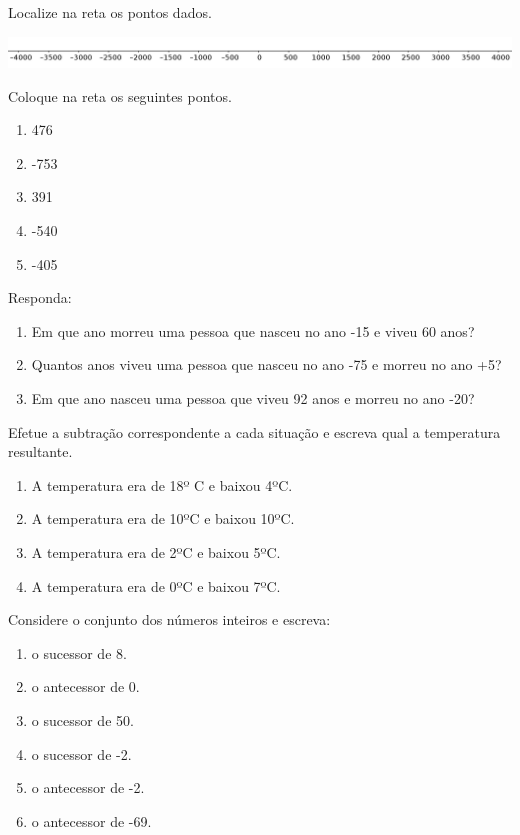 		\item Localize na reta os pontos dados.
		\begin{center}
			\includegraphics[scale=0.33]{figuras/fig43.png}
		\end{center}
		Coloque na reta os seguintes pontos.
		\begin{multicols}{5}
		\begin{enumerate}
			\item 476
			\item -753
			\item 391
			\item -540
			\item -405
		\end{enumerate}
		\end{multicols}
		\item Responda:
		\begin{enumerate}
			\item Em que ano morreu uma pessoa que nasceu no ano -15 e viveu 60 anos?
			\item Quantos anos viveu uma pessoa que nasceu no ano -75 e morreu no ano +5?
			\item Em que ano nasceu uma pessoa que viveu 92 anos e morreu no ano -20?
		\end{enumerate}
		
		\item Efetue a subtração correspondente a cada situação e escreva qual a temperatura resultante.		
		\begin{enumerate}
			\item A temperatura era de 18º C e baixou 4ºC.
			\item A temperatura era de 10ºC e baixou 10ºC.
			\item A temperatura era de 2ºC e baixou 5ºC.
			\item A temperatura era de 0ºC e baixou 7ºC.
		\end{enumerate}
		
		\item Considere o conjunto dos números inteiros e escreva:
		\begin{multicols}{2}		
		\begin{enumerate}
			\item o sucessor de 8.
			\item o antecessor de 0.
			\item o sucessor de 50.
			\item o sucessor de -2.
			\item o antecessor de -2.
			\item o antecessor de -69.
		\end{enumerate}
		\end{multicols}
		
